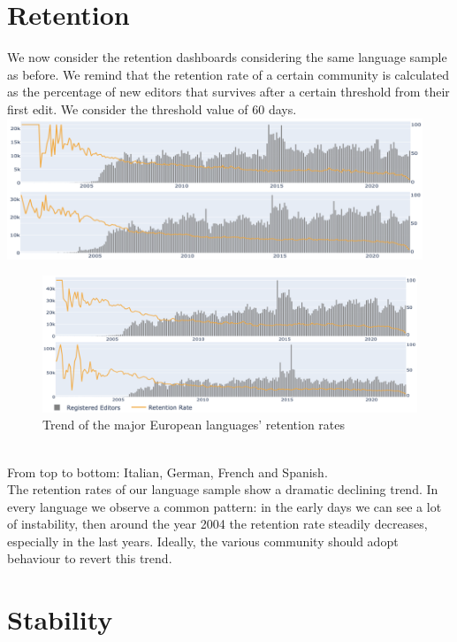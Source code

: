\section{Retention}
\label{sec:retention_conclusion}

We now consider the retention dashboards considering the same language sample as before. We remind that the retention rate of a certain community is calculated as the percentage of new editors that survives after a certain threshold from their first edit. We consider the threshold value of 60 days.\\

\includegraphics[width=470px]{img/retention_trend.png}
\pagebreak
\begin{figure}[h]
    \centering
    \includegraphics[width=470px]{img/retention_trend1.png}
    \caption{Trend of the major European languages' retention rates}
    \label{fig:retention_trend}
\end{figure}
\\
From top to bottom: Italian, German, French and Spanish.\\
The retention rates of our language sample show a dramatic declining trend. In every language we observe a common pattern: in the early days we can see a lot of instability, then around the year 2004 the retention rate steadily decreases, especially in the last years. Ideally, the various community should adopt behaviour to revert this trend.


\section{Stability}
\label{sec:stability_conclusion}

